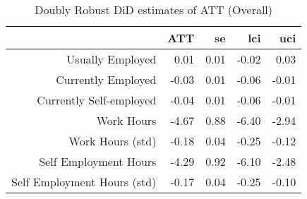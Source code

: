\begin{table}[ht]
\centering
\begin{tabular}{rrrrr}
  \toprule
 & ATT & se & lci & uci \\ 
  \midrule
Usually Employed & 0.01 & 0.01 & -0.02 & 0.03 \\ 
  Currently Employed & -0.03 & 0.01 & -0.06 & -0.01 \\ 
  Currently Self-employed & -0.04 & 0.01 & -0.06 & -0.01 \\ 
  Work Hours & -4.67 & 0.88 & -6.40 & -2.94 \\ 
  Work Hours (std) & -0.18 & 0.04 & -0.25 & -0.12 \\ 
  Self Employment Hours & -4.29 & 0.92 & -6.10 & -2.48 \\ 
  Self Employment Hours (std) & -0.17 & 0.04 & -0.25 & -0.10 \\ 
   \bottomrule
\end{tabular}
\caption{Doubly Robust DiD estimates of ATT (Overall)} 
\end{table}
